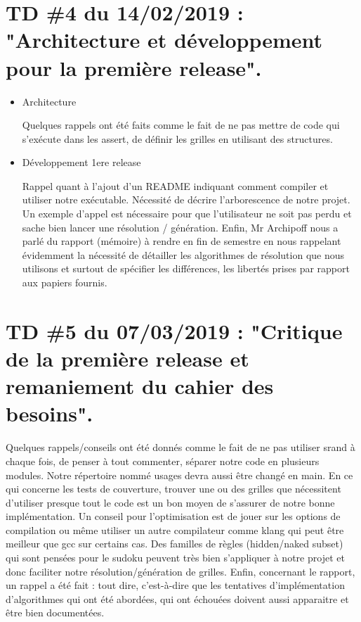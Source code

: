 \documentclass[1]{report}
\begin{document}
    \section{TD \#4 du 14/02/2019 : "Architecture et développement pour la première release".}

        \begin{itemize}

            \item{Architecture}

            Quelques rappels ont été faits comme le fait de ne pas mettre de code qui s’exécute dans les assert,
            de définir les grilles en utilisant des structures.

            \item{Développement 1ere release}

            Rappel quant à l’ajout d’un README indiquant comment compiler et utiliser notre exécutable.
            Nécessité de décrire l’arborescence de notre projet.
            Un exemple d’appel est nécessaire pour que l’utilisateur ne soit pas perdu et sache bien lancer une
            résolution / génération.
            Enfin, Mr Archipoff nous a parlé du rapport (mémoire) à rendre en fin de semestre en nous rappelant
            évidemment la nécessité de détailler les algorithmes de résolution que nous utilisons et surtout de
            spécifier les différences, les libertés prises par rapport aux papiers fournis.

        \end{itemize}

    \section{TD \#5 du 07/03/2019 : "Critique de la première release et remaniement du cahier des besoins".}

        Quelques rappels/conseils ont été donnés comme le fait de ne pas utiliser srand à chaque fois, de
        penser à tout commenter, séparer notre code en plusieurs modules. Notre répertoire nommé usages
        devra aussi être changé en main.
        En ce qui concerne les tests de couverture, trouver une ou des grilles que nécessitent d’utiliser
        presque tout le code est un bon moyen de s’assurer de notre bonne implémentation.
        Un conseil pour l’optimisation est de jouer sur les options de compilation ou même utiliser un autre
        compilateur comme klang qui peut être meilleur que gcc sur certains cas.
        Des familles de règles (hidden/naked subset) qui sont pensées pour le sudoku peuvent très bien
        s’appliquer à notre projet et donc faciliter notre résolution/génération de grilles.
        Enfin, concernant le rapport, un rappel a été fait : tout dire, c’est-à-dire que les tentatives
        d’implémentation d’algorithmes qui ont été abordées, qui ont échouées doivent aussi apparaitre et
        être bien documentées.
\end{document}

